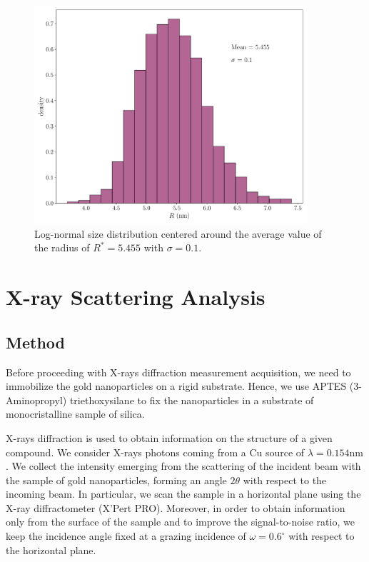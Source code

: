 \documentclass[prb,twocolumn]{revtex4-1}
\begin{document}
\begin{figure}[htp]
    \begin{minipage}[l]{1.0\columnwidth}
    \centering
    \includegraphics[width=0.9\textwidth]{images/os/size_distribution.pdf}
    \caption{Log-normal size distribution centered around the average value of the radius of $R^*=5.455$ with $\sigma=0.1$.}
    \label{fig:size_distribution}
    \end{minipage}
\end{figure}








\section{X-ray Scattering Analysis}

\subsection{Method}
Before proceeding with X-rays diffraction measurement acquisition, we need to immobilize the gold nanoparticles on a rigid substrate. Hence, we use APTES (3-Aminopropyl) triethoxysilane to fix the nanoparticles in a substrate of monocristalline sample of silica. 

X-rays diffraction is used to obtain information on the structure of a given compound. We consider X-rays photons coming from a \(\text{Cu}\) source of \(\lambda=0.154 \text{nm}\). 
We collect the intensity emerging from the scattering of the incident beam with the sample of gold nanoparticles, forming an angle \(2\theta\) with respect to the incoming beam. In particular, we scan the sample in a horizontal plane using the X-ray diffractometer (X'Pert PRO). Moreover, in order to obtain information only from the surface of the sample and to improve the signal-to-noise ratio, we keep the incidence angle fixed at a grazing incidence of \(\omega=0.6^\circ\) with respect to the horizontal plane. 
\end{document}
